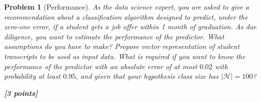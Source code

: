\documentclass[11pt]{article}
\newtheorem{problem}{Problem}
\newcommand{\point}[1]{\hfill {\bf [#1 points]}}
\newif\ifsolutions
\newcommand{\solution}[1]{
\ifsolutions
\smallskip
\par
\noindent\emph{Solution: } #1
\fi
}
\begin{document}
\solution{
    $$\theta(s) = S_+ = max\big\{0, s\big\}, \eta = 0.1$$ 
    forward propogation:
    $$a = 0 + x_1*w_{1a} + x_2*w_{2a} = 0 + 16*0.125 + 8*0.75 = 8$$
    $$x^1_1 = \theta(a) = max\big\{0,8\big\} = 8$$
    $$b = 0 + x_1*w_{1b} + x_2*w_{2b} = 0 + 16*0.5 + 8*0.25 = 10$$
    $$x^1_2 = \theta(b) = max\big\{0,10\big\} = 10$$
    $$c = 0 + x^1_1*w_{ac} + x^1_2*w_{bc} = 0 + 8*0.5 + 10*0.1 = 5$$
    $$h(x) = x^2_c = \theta(c) = max\big\{0,5\big\} = 5$$
    backpropogation:
    $$\frac{\partial e(\textbf{w})}{\partial w_{bc}} = \frac{\partial e(\textbf{w})}{\partial c}*\frac{\partial c}{\partial w_bc}$$
    $$\frac{\partial c}{\partial w_bc}=x^1_2 = 10, \frac{\partial e(\textbf{w})}{\partial c} = \delta c$$
    $$e(\textbf w)=\frac{1}{2}\big(\theta(c)-y\big)^2$$
    $$\theta'(c) = 
    \begin{cases}
        0\quad(c<0)\\
        1\quad(c>=0)
    \end{cases}$$
    $$\delta c = \frac{\partial e(\textbf w)}{\partial \theta(c)}*\frac{\partial \theta(c)}{\partial c} = \big(\theta(c) - y\big)*1 = 5 - 5 = 0$$
    $$\frac{\partial e(\textbf w)}{w_{bc}} = 0 * 10 = 0$$ 
    $$w'_{bc} = w_{bc} - \eta * \frac{\partial e(\textbf w)}{w_{bc}} = 0.1 - 0.1 * 0 = 0.1$$
}

\begin{problem}[Performance]\em
As the data science expert, you are asked to give a recommendation about a classification algorithm designed to predict, under the zero-one error, if a student gets a job offer within 1 month of graduation. As due diligence, you want to estimate the performance of the predictor. What assumptions do you have to make? Propose  vector representation of student transcripts to be used as input data. What is required if you want to know the performance of the predictor with an absolute error of at most $0.02$ with probability at least $0.95$, and given that your hypothesis class size has $\mathcal{|H|}=100$? 

\point{3}

\solution{ 

[Present your solution here...]

}
\end{problem}
\end{document}
